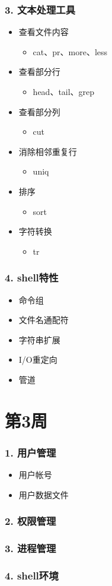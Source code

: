 \documentclass[bigger]{beamer}
\begin{document}
\begin{frame}
\frametitle{3. 文本处理工具}
\label{sec-2-3}

\begin{itemize}
\item 查看文件内容
\begin{itemize}
\item cat、pr、more、less
\end{itemize}
\item 查看部分行
\begin{itemize}
\item head、tail、grep
\end{itemize}
\item 查看部分列
\begin{itemize}
\item cut
\end{itemize}
\item 消除相邻重复行
\begin{itemize}
\item uniq
\end{itemize}
\item 排序
\begin{itemize}
\item sort
\end{itemize}
\item 字符转换
\begin{itemize}
\item tr
\end{itemize}
\end{itemize}
\end{frame}
\begin{frame}
\frametitle{4. shell特性}
\label{sec-2-4}

\begin{itemize}
\item 命令组
\item 文件名通配符
\item 字符串扩展
\item I/O重定向
\item 管道
\end{itemize}
\end{frame}
\section{第3周}
\label{sec-3}
\begin{frame}
\frametitle{1. 用户管理}
\label{sec-3-1}

\begin{itemize}
\item 用户帐号
\item 用户数据文件
\end{itemize}
\end{frame}
\begin{frame}
\frametitle{2. 权限管理}
\label{sec-3-2}
\end{frame}
\begin{frame}
\frametitle{3. 进程管理}
\label{sec-3-3}
\end{frame}
\begin{frame}
\frametitle{4. shell环境}
\label{sec-3-4}
\end{frame}
\end{document}
